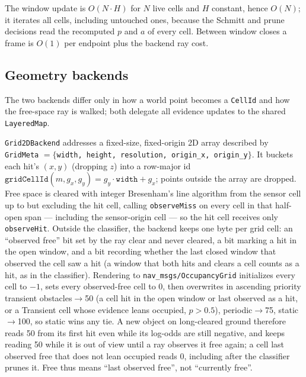 \documentclass[conference]{IEEEtran}
\begin{document}
The window update is $O(N\cdot H)$ for $N$ live cells and $H$ constant, hence
$O(N)$; it iterates all cells, including untouched ones, because the Schmitt
and prune decisions read the recomputed $p$ and $a$ of every cell. Between
window closes a frame is $O(1)$ per endpoint plus the backend ray cost.

\subsection{Geometry backends}
\label{sec:backends}

The two backends differ only in how a world point becomes a \texttt{CellId} and how the
free-space ray is walked; both delegate all evidence updates to the shared
\texttt{LayeredMap}.

\texttt{Grid2DBackend} addresses a fixed-size, fixed-origin 2D array described by
\texttt{GridMeta} $=\{$\texttt{width, height, resolution, origin\_x, origin\_y}$\}$. It buckets
each hit's $(x,y)$ (dropping $z$) into a row-major id
$\texttt{gridCellId}(m,g_x,g_y)=g_y\cdot\texttt{width}+g_x$; points outside the
array are dropped. Free space is cleared with integer Bresenham's line algorithm
\cite{bresenham1965} from the sensor cell up to but excluding the hit cell, calling \texttt{observeMiss}
on every cell in that half-open span --- including the sensor-origin cell --- so
the hit cell receives only
\texttt{observeHit}. Outside the classifier, the backend keeps one byte per
grid cell: an ``observed free'' bit set by the ray clear and never cleared, a bit
marking a hit in the open window, and a bit recording whether the last closed
window that observed the cell saw a hit (a window that both hits and clears a
cell counts as a hit, as in the classifier).
Rendering to \texttt{nav\_msgs/OccupancyGrid} initializes every cell to $-1$,
sets every observed-free cell to 0, then overwrites in ascending priority
transient obstacles$\to$50 (a cell hit in the open window or last observed as
a hit, or a Transient cell whose evidence leans occupied, $p>0.5$), periodic$\to$75,
static$\to$100, so static wins any tie. A new object on long-cleared ground
therefore reads 50 from its first hit even while its log-odds are still
negative, and keeps reading 50 while it is out of view until a ray observes it
free again; a cell last observed free that does not lean occupied reads 0,
including after the classifier prunes it. Free thus means ``last observed free'', not ``currently free''.
\end{document}
